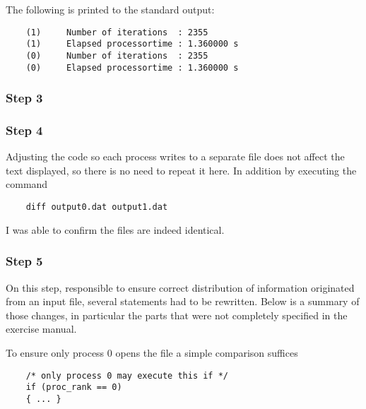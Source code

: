 The following is printed to the standard output:
\begin{lstlisting}
    (1)     Number of iterations  : 2355
    (1)     Elapsed processortime : 1.360000 s
    (0)     Number of iterations  : 2355
    (0)     Elapsed processortime : 1.360000 s
\end{lstlisting}

\subsubsection{Step 3}


\subsubsection{Step 4}

Adjusting the code so each process writes to a separate file does not affect the text displayed, so there is no need to repeat it here. In addition by executing the command

\begin{lstlisting}
    diff output0.dat output1.dat
\end{lstlisting}

I was able to confirm the files are indeed identical.

\subsubsection{Step 5}

On this step, responsible to ensure correct distribution of information originated from an input file, several statements had to be rewritten. Below is a summary of those changes, in particular the parts that were not completely specified in the exercise manual.

To ensure only process 0 opens the file a simple comparison suffices
\begin{lstlisting}
    /* only process 0 may execute this if */
    if (proc_rank == 0)
    { ... }
\end{lstlisting}

